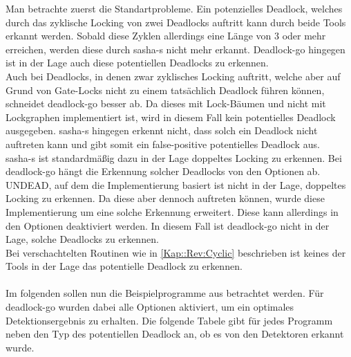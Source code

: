 Man betrachte zuerst die Standartprobleme. Ein potenzielles Deadlock, welches 
durch das zyklische Locking von zwei Deadlocks auftritt kann durch beide Tools
erkannt werden. Sobald diese Zyklen allerdings eine Länge von 3 oder mehr 
erreichen, werden diese durch sasha-s nicht mehr erkannt. Deadlock-go 
hingegen ist in der Lage auch diese potentiellen Deadlocks zu erkennen.\\
Auch bei Deadlocks, in denen zwar zyklisches Locking auftritt, welche aber 
auf Grund von Gate-Locks nicht zu einem tatsächlich Deadlock führen können,
schneidet deadlock-go besser ab. Da dieses mit Lock-Bäumen und nicht mit 
Lockgraphen implementiert ist, wird in diesem Fall kein potentielles Deadlock 
ausgegeben. sasha-s hingegen erkennt nicht, dass solch ein Deadlock nicht 
auftreten kann und gibt somit ein false-positive potentielles Deadlock aus.\\ 
sasha-s ist standardmäßig dazu in  der Lage doppeltes Locking zu erkennen.
Bei deadlock-go hängt die Erkennung solcher Deadlocks von den Optionen ab.
UNDEAD, auf dem die Implementierung basiert ist nicht in der Lage, doppeltes 
Locking zu erkennen. Da diese aber dennoch auftreten können, wurde diese 
Implementierung um eine solche Erkennung erweitert. Diese kann allerdings 
in den Optionen deaktiviert werden. In diesem Fall ist deadlock-go nicht in 
der Lage, solche Deadlocks zu erkennen. \\ 
Bei verschachtelten Routinen wie in \ref{Kap::Rev:Cyclic} beschrieben ist 
keines der Tools in der Lage das potentielle Deadlock zu erkennen.\\\\ 
Im folgenden sollen nun die Beispielprogramme aus \cite{implementation} 
betrachtet werden. Für deadlock-go wurden dabei alle Optionen aktiviert, um ein 
optimales Detektionsergebnis zu erhalten.
Die folgende Tabele gibt für jedes Programm neben den
Typ des potentiellen Deadlock an, ob es von den Detektoren erkannt wurde. 
